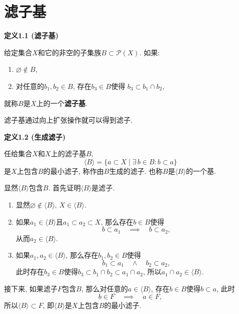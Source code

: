 \documentclass[UTF8]{ctexart}
\begin{document}
\setlength{\abovedisplayskip}{1pt}
\setlength{\belowdisplayskip}{1pt}

\section{滤子基}


\hypertarget{sec:定义1.1}{}
\noindent\textbf{定义1.1 (滤子基)}

给定集合$X$和它的非空的子集族$B\subset\mathcal{P}(X)$. 如果:
\begin{enumerate}
    \item $\varnothing\notin B$,
    \item 对任意的$b_1,b_2\in B$, 存在$b_3\in B$使得
    $b_3\subset b_1\cap b_2$,
\end{enumerate}
就称$B$是$X$上的一个\textbf{滤子基}.

\vspace{10pt}

滤子基通过向上扩张操作就可以得到滤子.

\vspace{10pt}

\hypertarget{sec:定义1.2}{}
\noindent\textbf{定义1.2 (生成滤子)}

任给集合$X$和$X$上的滤子基$B$,
\[
    \langle B\rangle=\{a\subset X\mid\exists\,b\in B:b\subset a\}
\]
是$X$上包含$B$的最小滤子, 称作由$B$生成的滤子.
也称$B$是$\langle B\rangle$的一个基.


显然$\langle B\rangle$包含$B$. 首先证明$\langle B\rangle$是滤子.

\begin{enumerate}
    \item 显然$\varnothing\notin\langle B\rangle,\,X\in\langle B\rangle$.
    \item 如果$a_1\in\langle B\rangle$且$a_1\subset a_2\subset X$,
    那么存在$b\in B$使得
    \[
        b\subset a_1\quad\implies\quad b\subset a_2,
    \]
    从而$a_2\in\langle B\rangle$.
    \item 如果$a_1,a_2\in\langle B\rangle$, 那么存在$b_1,b_2\in B$使得
    \[
        b_1\subset a_1\quad\land\quad b_2\subset a_2,
    \]
    此时存在$b_3\in B$使得$b_3\subset b_1\cap b_2\subset a_1\cap a_2$,
    所以$a_1\cap a_2\in\langle B\rangle$.
\end{enumerate}

接下来, 如果滤子$F$包含$B$, 那么对任意的$a\in\langle B\rangle$,
存在$b\in B$使得$b\subset a$, 此时
\[
    b\in F\quad\implies\quad a\in F,
\]
所以$\langle B\rangle\subset F$, 即$\langle B\rangle$是$X$上包含$B$的最小滤子.
\end{document}
